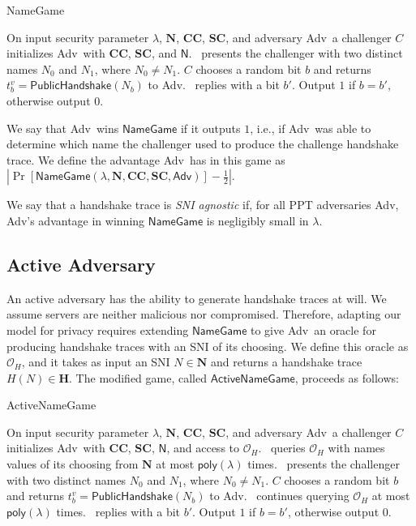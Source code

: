 \documentclass{article}
\newcommand{\adv}{{\sf Adv}}
\newcommand{\madv}{\mathsf{Adv}}
\theoremstyle{definition}
\begin{document}
\begin{algorithm}
\caption{{\sf NameGame}} 
\label{alg:esnigame}
\begin{algorithmic}[1]
  \STATE On input security parameter $\lambda$, $\mathbf{N}$, $\mathbf{CC}$, $\mathbf{SC}$, 
  and adversary \adv\, a challenger $C$ initializes \adv\ with $\mathbf{CC}$, $\mathbf{SC}$, and $\mathsf{N}$. 
  \STATE \adv\ presents the challenger with two distinct names $N_0$ and $N_1$, where $N_0 \not= N_1$.
  \STATE $C$ chooses a random bit $b$ and returns $t_b^v = \mathsf{PublicHandshake}(N_b)$ to \adv.
  \STATE \adv\ replies with a bit $b'$.
  \STATE Output $1$ if $b = b'$, otherwise output $0$.
\end{algorithmic}
\end{algorithm}

We say that \adv\ wins $\mathsf{NameGame}$ if it outputs $1$, i.e., if \adv\ was able to determine which
name the challenger used to produce the challenge handshake trace. We define the advantage \adv\ has in this 
game as $|\Pr[\mathsf{NameGame}(\lambda, \mathbf{N}, \mathbf{CC}, \mathbf{SC}, \madv)] - \frac{1}{2}|$. 

We say that a handshake trace is \emph{SNI agnostic} if, for all PPT adversaries \adv, \adv's advantage in 
winning $\mathsf{NameGame}$ is negligibly small in $\lambda$. 

\subsection{Active Adversary}

An active adversary has the ability to generate handshake traces at will. We assume servers are neither malicious nor compromised. 
Therefore, adapting our model for privacy requires extending $\mathsf{NameGame}$ to give \adv\ an oracle for producing handshake
traces with an SNI of its choosing. We define this oracle as $\mathcal{O}_H$, and it takes as input an SNI $N \in \mathbf{N}$
and returns a handshake trace $H(N) \in \mathbf{H}$. The modified game, called $\mathsf{ActiveNameGame}$, proceeds as follows:

\begin{algorithm}
\caption{{\sf ActiveNameGame}} 
\label{alg:active-esnigame}
\begin{algorithmic}[1]
  \STATE On input security parameter $\lambda$, $\mathbf{N}$, $\mathbf{CC}$, $\mathbf{SC}$, 
  and adversary \adv\, a challenger $C$ initializes \adv\ with $\mathbf{CC}$, $\mathbf{SC}$, 
  $\mathsf{N}$, and access to $\mathcal{O}_H$.
  \STATE \adv\ queries $\mathcal{O}_H$ with names values of its choosing from $\mathbf{N}$ at most $\mathsf{poly}(\lambda)$ times.
  \STATE \adv\ presents the challenger with two distinct names $N_0$ and $N_1$, where $N_0 \not= N_1$.
  \STATE $C$ chooses a random bit $b$ and returns $t_b^v = \mathsf{PublicHandshake}(N_b)$ to \adv.
  \STATE \adv\ continues querying $\mathcal{O}_H$ at most $\mathsf{poly}(\lambda)$ times.
  \STATE \adv\ replies with a bit $b'$.
  \STATE Output $1$ if $b = b'$, otherwise output $0$.
\end{algorithmic}
\end{algorithm}
\end{document}
